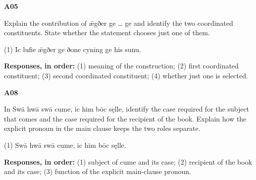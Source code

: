 \par\begin{minipage}{\linewidth}\raggedright
\textbf{A05}

Explain the contribution of ǣgðer ge … ge and identify the two coordinated constituents. State whether the statement chooses just one of them.

(1) Ic lufie ǣgðer ge ðone cyning ge his sunu.

\textbf{Responses, in order:} (1) meaning of the construction; (2) first coordinated constituent; (3) second coordinated constituent; (4) whether just one is selected.

\end{minipage}\par\addvspace{4pt}

\par\begin{minipage}{\linewidth}\raggedright
\textbf{A08}

In Swā hwā swā cume, ic him bōc sęlle, identify the case required for the subject that comes and the case required for the recipient of the book. Explain how the explicit pronoun in the main clause keeps the two roles separate.

(1) Swā hwā swā cume, ic him bōc sęlle.

\textbf{Responses, in order:} (1) subject of cume and its case; (2) recipient of the book and its case; (3) function of the explicit main-clause pronoun.

\end{minipage}\par\addvspace{4pt}

